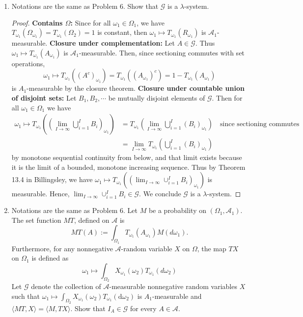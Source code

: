 \documentclass[letterpaper, 12pt]{article}
\newcommand{\cA}{\mathcal{A}}
\newcommand{\cG}{\mathcal{G}}
\newcommand{\sG}{\mathscr{G}}
\begin{document}
\begin{enumerate}
\item
Notations are the same as Problem 6. Show that $\sG$ is a $\lambda$-system.
\begin{proof}
\textbf{Contains $\Omega$:} Since for all $\omega_1 \in \Omega_1$, we have $T_{\omega_1}(\Omega_{\omega_1}) = T_{\omega_1}(\Omega_2) = 1$ is constant, then $\omega_1\mapsto T_{\omega_1}(R_{\omega_1})$ is $\cA_1$-measurable.
\textbf{Closure under complementation:} Let $A \in \sG$. Thus $\omega_1\mapsto T_{\omega_1}(A_{\omega_1})$ is $\cA_1$-measurable. Then, since sectioning commutes with set operations, 
\[
\omega_1 \mapsto T_{\omega_1} ((A^c)_{\omega_1}) = T_{\omega_1}((A_{\omega_1})^c) = 1 - T_{\omega_1} (A_{\omega_1})
\]
is $A_1$-measurable by the closure theorem.
\textbf{Closure under countable union of disjoint sets: } Let $B_1, B_2, \cdots$ be mutually disjoint elements of $\sG$. Then for all $\omega_1 \in \Omega_1$ we have
\begin{align*}
\omega_1 \mapsto T_{\omega_1} \left(\left( \lim_{I \to \infty}\bigcup_{i = 1}^I B_i\right)_{\omega_1} \right) 
&= T_{\omega_1}\left( \lim_{I \to \infty} \bigcup_{i=1}^I (B_i)_{\omega_1} \right) 
\quad \text{since sectioning commutes}\\
&= \lim_{I \to \infty} T_{\omega_1}\left(\bigcup_{i=1}^I (B_i)_{\omega_1} \right)  
\end{align*}
by monotone sequential continuity from below, and that limit exists because it is the limit of a bounded, monotone increasing sequence. Thus by Theorem 13.4 in Billingsley, we have  $\omega_1 \mapsto T_{\omega_1} \left(\left( \lim_{I \to \infty}\cup_{i = 1}^I B_i\right)_{\omega_1} \right)$ is measurable. Hence, $\lim_{I \to \infty}\cup_{i = 1}^I B_i \in \sG$.
We conclude $\sG$ is a $\lambda$-system.
\end{proof}

\item
Notations are the same as Problem 6. 
Let $M$ be a probability on $(\Omega_1, \cA_1)$. 
The set function $MT$, defined on $\cA$ is 
\[
MT(A) := \int_{\Omega_1} T_{\omega_1} (A_{\omega_1}) M (d \omega_1)
\text{.}
\]
Furthermore, for any nonnegative $\cA$-random variable $X$ on $\Omega$, the map $TX$ on $\Omega_1$ is defined as 
\[
\omega_1 \mapsto \int_{\Omega_2} X_{\omega_1} (\omega_2) T_{\omega_1} (d \omega_2)
\]
Let $\cG$ denote the collection of $\cA$-measurable nonnegative random variables $X$ such that $\omega_1\mapsto\int_{\Omega_2}X_{\omega_1}(\omega_2)T_{\omega_1}(\text{d}\omega_2)$ is $A_1$-measurable and $\langle MT,X\rangle= \langle M,TX \rangle$. 
Show that $I_A\in\cG$ for every $A\in\cA$.


\end{enumerate}
\end{document}

